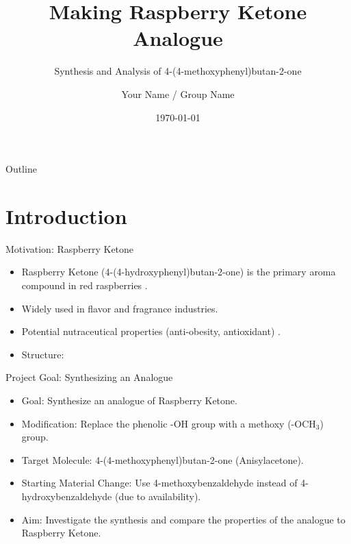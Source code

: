 \documentclass[10pt]{beamer}
\title{Making Raspberry Ketone Analogue}
\subtitle{Synthesis and Analysis of 4-(4-methoxyphenyl)butan-2-one}
\author{Your Name / Group Name}
\institute{Department of Chemistry \\ Course: CH3204 Organic Synthesis}
\date{\today}
\begin{document}
\begin{frame}[plain] %
    \titlepage
\end{frame}

\begin{frame}{Outline}
    \tableofcontents
\end{frame}

\section{Introduction}

\begin{frame}{Motivation: Raspberry Ketone}
    \begin{itemize}
        \item Raspberry Ketone (4-(4-hydroxyphenyl)butan-2-one) is the primary aroma compound in red raspberries \cite{RaspberryKetoneWiki}.
        \item Widely used in flavor and fragrance industries.
        \item Potential nutraceutical properties (anti-obesity, antioxidant) \cite{PharmacologicalExplorationRK}.
        \item Structure:
            \begin{center}
                \caption{Raspberry Ketone}
            \end{center}
    \end{itemize}
\end{frame}

\begin{frame}{Project Goal: Synthesizing an Analogue}
    \begin{itemize}
        \item Goal: Synthesize an analogue of Raspberry Ketone.
        \item Modification: Replace the phenolic -OH group with a methoxy (-OCH$_3$) group.
        \item Target Molecule: 4-(4-methoxyphenyl)butan-2-one (Anisylacetone).
            \begin{center}
                \caption{Target Analogue: Anisylacetone}
            \end{center}
        \item Starting Material Change: Use 4-methoxybenzaldehyde instead of 4-hydroxybenzaldehyde (due to availability).
        \item Aim: Investigate the synthesis and compare the properties of the analogue to Raspberry Ketone.
    \end{itemize}
\end{frame}
\end{document}
